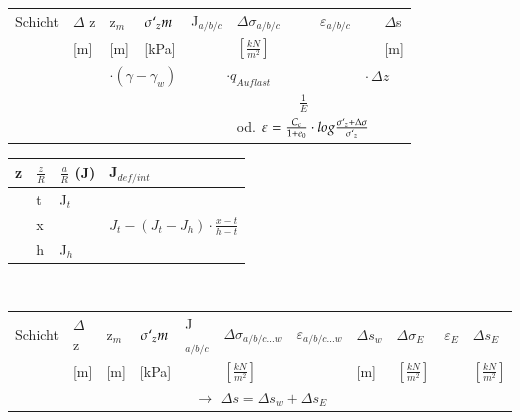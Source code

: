 	
	\begin{minipage}{0.7\linewidth}
		\begin{tabular}{|l|l|l|l|l|l|l|l|}
			\hline
			Schicht	& $\Delta$ z	& z$_m$		& $\sigma`_zm$	& J$_{a/b/c}$	& $\Delta \sigma_{a/b/c}$ 	& $\varepsilon_{a/b/c}$ 	& $\Delta$s \\
			& [m]			& [m]		&  [kPa]		& 				& $\left[\frac{kN}{m^2}\right]$ &		& [m] \\ \hline
			
			&		& \multicolumn{2}{c|}{$\cdot (\gamma - \gamma_w)$} &		\multicolumn{2}{c|}{$\cdot q_{Auflast}$} & \multicolumn{2}{c|}{$\qquad \cdot \Delta z$} \\
			&	&	&	&	& \multicolumn{2}{c|}{$\frac{1}{E}$} & \\
			&	&	&	&	&\multicolumn{2}{c|}{ od. $\varepsilon=\frac{C_c}{1 + e_0} \cdot log \frac{\sigma`_z + \Delta \sigma}{\sigma`_z}$} & \\ \hline 	
		\end{tabular}
		\vspace{\baselineskip}
	\end{minipage}	
	\begin{minipage}{0.4\linewidth}
		\begin{tabular}{l|l|l|l}
			\hline
			z	&	$\frac{z}{R}$	&	$\frac{a}{R}$ (J)	&	J$_{def/int}$	\\ \hline
			& \qquad	t		&	J$_t$				&	\\
			&	x				&						& $J_t - (J_t - J_h) \cdot \frac{x - t}{h - t}$	\\
			& \qquad	h		&	J$_h$				&	\\
		\end{tabular}
		\vspace{\baselineskip} \\
	\end{minipage}
	
	
	
	\begin{minipage}{\linewidth}
		\begin{tabular}{|l|l|l|l|l|l|l|l|l|l|l|}
			\hline
			Schicht	& $\Delta$ z	& z$_m$		& $\sigma`_zm$	& J$_{a/b/c}$	& $\Delta \sigma_{a/b/c...w}$ 	& $\varepsilon_{a/b/c...w}$ 	& $\Delta s_w$ & $\Delta \sigma_E$ & $\varepsilon_E$ & $\Delta s_E$	\\
			& [m]			& [m]		&  [kPa]		& 				& $\left[\frac{kN}{m^2}\right]$ &		& [m] 	& $\left[\frac{kN}{m^2}\right]$ &		 & $\left[\frac{kN}{m^2}\right]$ \\ \hline
			\multicolumn{11}{|c|}{$\rightarrow$ $\Delta s = \Delta s_w + \Delta s_E$} \\
		\end{tabular}
		
		\vspace{\baselineskip}
	\end{minipage}
	
